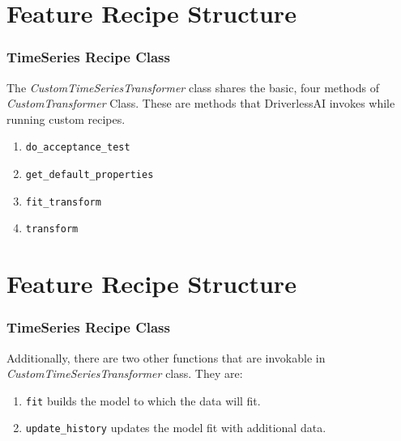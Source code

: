 \documentclass[11pt,
aspectratio=169,
hyperref={colorlinks}
]{beamer}
\begin{document}
\section{Feature Recipe Structure}
\begin{frame}[fragile]
        \frametitle{TimeSeries Recipe Class}
        The \textit{CustomTimeSeriesTransformer} class shares the basic, four methods of \textit{CustomTransformer} Class. These are methods that DriverlessAI invokes while running custom recipes.
        \begin{enumerate}
                \item \verb|do_acceptance_test|
                \item \verb|get_default_properties|
                \item \verb|fit_transform|
                \item \verb|transform|
        \end{enumerate}

\end{frame}
\section{Feature Recipe Structure}
\begin{frame}[fragile]
        \frametitle{TimeSeries Recipe Class}
        Additionally, there are two other functions that are invokable in \textit{CustomTimeSeriesTransformer} class. They are:
        \begin{enumerate}
                \item \verb|fit| builds the model to which the data will fit. 
                \item \verb|update_history| updates the model fit with additional data. 
        \end{enumerate}

\end{frame}
\end{document}
